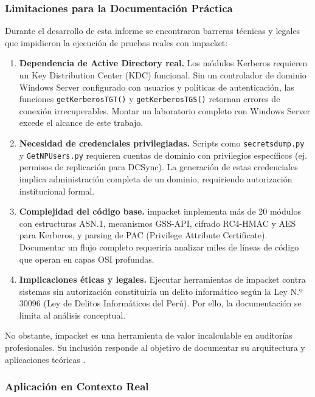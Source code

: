 \documentclass[12pt,a4paper]{article}
\begin{document}
\subsubsection{Limitaciones para la Documentación Práctica}

Durante el desarrollo de esta informe se encontraron barreras técnicas
y legales que impidieron la ejecución de pruebas reales con impacket:

\begin{enumerate}
\item \textbf{Dependencia de Active Directory real.} Los módulos Kerberos
  requieren un Key Distribution Center (KDC) funcional. Sin un
  controlador de dominio Windows Server configurado con usuarios y
  políticas de autenticación, las funciones \texttt{getKerberosTGT()} y
  \texttt{getKerberosTGS()} retornan errores de conexión irrecuperables.
  Montar un laboratorio completo con Windows Server excede el alcance de
  este trabajo.

\item \textbf{Necesidad de credenciales privilegiadas.} Scripts como
  \texttt{secretsdump.py} y \texttt{GetNPUsers.py} requieren cuentas de
  dominio con privilegios específicos (ej. permisos de replicación para
  DCSync). La generación de estas credenciales implica administración
  completa de un dominio, requiriendo autorización institucional formal.

\item \textbf{Complejidad del código base.} impacket implementa más de 20
  módulos con estructuras ASN.1, mecanismos GSS-API, cifrado RC4-HMAC y
  AES para Kerberos, y parsing de PAC (Privilege Attribute Certificate).
  Documentar un flujo completo requeriría analizar miles de líneas de
  código que operan en capas OSI profundas.

\item \textbf{Implicaciones éticas y legales.} Ejecutar herramientas de
  impacket contra sistemas sin autorización constituiría un delito
  informático según la Ley N.º 30096 (Ley de Delitos Informáticos del
  Perú). Por ello, la documentación se limita al análisis conceptual.

\end{enumerate}

No obstante, impacket es una herramienta de valor incalculable en
auditorías profesionales. Su inclusión responde al objetivo de
documentar su arquitectura y aplicaciones teóricas \cite{fortra2024}.

\subsubsection{Aplicación en Contexto Real}
\end{document}
